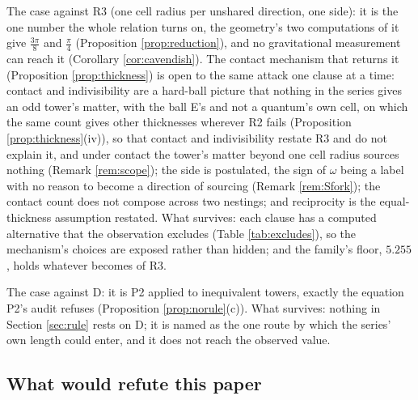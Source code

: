 \documentclass[11pt]{article}
\theoremstyle{definition}
\begin{document}
The case against R3 (one cell radius per unshared direction, one side): it is the one number the whole relation turns on, the geometry's two computations of it give $\tfrac{3\pi}{8}$ and $\tfrac{\pi}{4}$ (Proposition \ref{prop:reduction}), and no gravitational measurement can reach it (Corollary \ref{cor:cavendish}). The contact mechanism that returns it (Proposition \ref{prop:thickness}) is open to the same attack one clause at a time: contact and indivisibility are a hard-ball picture that nothing in the series gives an odd tower's matter, with the ball E's and not a quantum's own cell, on which the same count gives other thicknesses wherever R2 fails (Proposition \ref{prop:thickness}(iv)), so that contact and indivisibility restate R3 and do not explain it, and under contact the tower's matter beyond one cell radius sources nothing (Remark \ref{rem:scope}); the side is postulated, the sign of $\omega$ being a label with no reason to become a direction of sourcing (Remark \ref{rem:Sfork}); the contact count does not compose across two nestings; and reciprocity is the equal-thickness assumption restated. What survives: each clause has a computed alternative that the observation excludes (Table \ref{tab:excludes}), so the mechanism's choices are exposed rather than hidden; and the family's floor, $5.255$, holds whatever becomes of R3.

The case against D: it is P2 applied to inequivalent towers, exactly the equation P2's audit refuses (Proposition \ref{prop:norule}(c)). What survives: nothing in Section \ref{sec:rule} rests on D; it is named as the one route by which the series' own length could enter, and it does not reach the observed value.

\subsection*{What would refute this paper}
\end{document}
